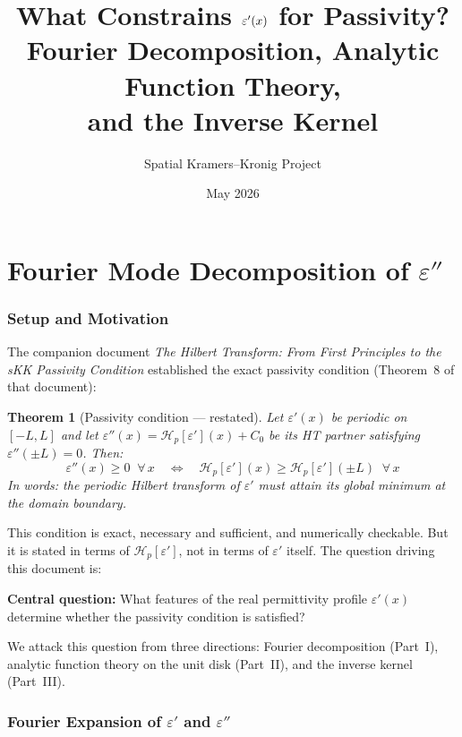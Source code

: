 \documentclass[11pt]{article}
\title{What Constrains $\eps'(x)$ for Passivity?\\[4pt]
\large Fourier Decomposition, Analytic Function Theory,\\
and the Inverse Kernel}
\author{Spatial Kramers--Kronig Project}
\date{May 2026}
\newtheorem{theorem}{Theorem}
\newcommand{\eps}{\varepsilon}
\newcommand{\Hp}{\mathcal{H}_p}
\begin{document}
\maketitle
\tableofcontents
\newpage

\part{Fourier Mode Decomposition of $\eps''$}

\section{Setup and Motivation}

The companion document \textit{The Hilbert Transform: From First Principles to the sKK Passivity Condition} established the exact passivity condition (Theorem~8 of that document):

\begin{theorem}[Passivity condition --- restated]\label{thm:passivity}
Let $\eps'(x)$ be periodic on $[-L,L]$ and let $\eps''(x) = \Hp[\eps'](x) + C_0$ be its HT partner satisfying $\eps''(\pm L) = 0$.  Then:
\begin{equation}
\boxed{\eps''(x) \geq 0 \;\;\forall\, x \quad\Longleftrightarrow\quad \Hp[\eps'](x) \geq \Hp[\eps']({\pm L}) \;\;\forall\, x}
\end{equation}
In words: the periodic Hilbert transform of $\eps'$ must attain its global minimum at the domain boundary.
\end{theorem}

This condition is exact, necessary and sufficient, and numerically checkable.  But it is stated in terms of $\Hp[\eps']$, not in terms of $\eps'$ itself.  The question driving this document is:

\medskip
\noindent\textbf{Central question:} What features of the real permittivity profile $\eps'(x)$ determine whether the passivity condition is satisfied?

\medskip
We attack this question from three directions: Fourier decomposition (Part~I), analytic function theory on the unit disk (Part~II), and the inverse kernel (Part~III).

\section{Fourier Expansion of $\eps'$ and $\eps''$}\label{sec:fourier-setup}
\end{document}
